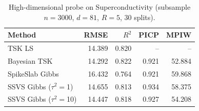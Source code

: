 \begin{table}[htbp]
\centering
\caption{High-dimensional probe on Superconductivity (subsample $n=3000$, $d=81$, $R=5$, 30 splits).}
\label{tab:highdim}
\scriptsize
\begin{tabular}{lrrrr}
\toprule
Method & RMSE & $R^2$ & PICP & MPIW \\
\midrule
TSK LS & 14.389 & 0.820 & -- & -- \\
Bayesian TSK & 14.292 & 0.822 & 0.921 & 52.884 \\
SpikeSlab Gibbs & 16.432 & 0.764 & 0.921 & 59.868 \\
SSVS Gibbs ($\tau^2=$1) & 14.655 & 0.813 & 0.934 & 58.375 \\
SSVS Gibbs ($\tau^2=$10) & 14.447 & 0.818 & 0.927 & 54.208 \\
\bottomrule
\end{tabular}
\end{table}
